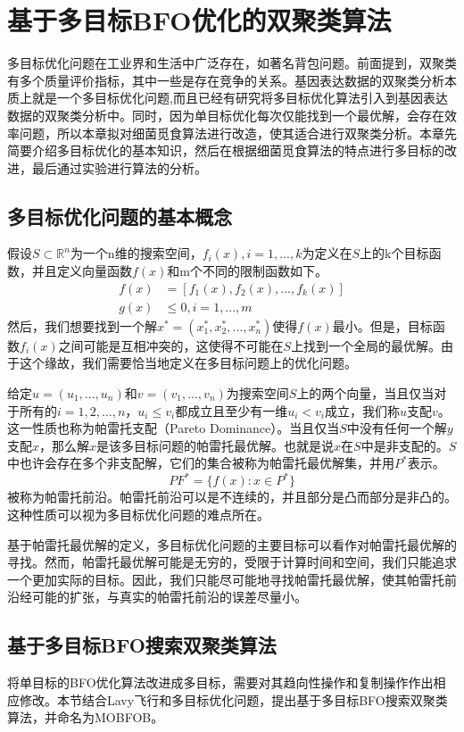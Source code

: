 \chapter{基于多目标BFO优化的双聚类算法}
多目标优化问题在工业界和生活中广泛存在，如著名背包问题。前面提到，双聚类有多个质量评价指标，其中一些是存在竞争的关系。基因表达数据的双聚类分析本质上就是一个多目标优化问题,而且已经有研究将多目标优化算法引入到基因表达数据的双聚类分析中。同时，因为单目标优化每次仅能找到一个最优解，会存在效率问题，所以本章拟对细菌觅食算法进行改造，使其适合进行双聚类分析。本章先简要介绍多目标优化的基本知识，然后在根据细菌觅食算法的特点进行多目标的改进，最后通过实验进行算法的分析。

\section{多目标优化问题的基本概念}
假设$S\subset \mathbb{R}^n$为一个n维的搜索空间，$f_i(x),i=1,...,k$为定义在$S$上的k个目标函数，并且定义向量函数$f(x)$和m个不同的限制函数如下。
\begin{align}
   f(x) &= [f_1(x),f_2(x),...,f_k(x)] \\
    g(x) &\leq 0, i= 1,...,m
\end{align}
然后，我们想要找到一个解$x^{\ast} =(x_1^{\ast},x_2^{\ast},...,x_n^{\ast})$使得$f(x)$最小。但是，目标函数$f_i(x)$之间可能是互相冲突的，这使得不可能在$S$上找到一个全局的最优解。由于这个缘故，我们需要恰当地定义在多目标问题上的优化问题。

给定$u=(u_1,...,u_n)$和$v=(v_1,...,v_n)$为搜索空间$S$上的两个向量，当且仅当对于所有的$i=1,2,...,n$，$u_i \le v_i$都成立且至少有一维$u_i<v_i$成立，我们称$u$支配$v$。这一性质也称为帕雷托支配（Pareto Dominance）。当且仅当$S$中没有任何一个解$y$支配$x$，那么解$x$是该多目标问题的帕雷托最优解。也就是说$x$在$S$中是非支配的。$S$中也许会存在多个非支配解，它们的集合被称为帕雷托最优解集，并用$P^*$表示。
\begin{equation}
   PF^* = \{f(x): x\in P^*\} 
\end{equation}
被称为帕雷托前沿。帕雷托前沿可以是不连续的，并且部分是凸而部分是非凸的。这种性质可以视为多目标优化问题的难点所在。

基于帕雷托最优解的定义，多目标优化问题的主要目标可以看作对帕雷托最优解的寻找。然而，帕雷托最优解可能是无穷的，受限于计算时间和空间，我们只能追求一个更加实际的目标。因此，我们只能尽可能地寻找帕雷托最优解，使其帕雷托前沿经可能的扩张，与真实的帕雷托前沿的误差尽量小。

\section{基于多目标BFO搜索双聚类算法}
将单目标的BFO优化算法改进成多目标，需要对其趋向性操作和复制操作作出相应修改。本节结合Lavy飞行和多目标优化问题，提出基于多目标BFO搜索双聚类算法，并命名为MOBFOB。

